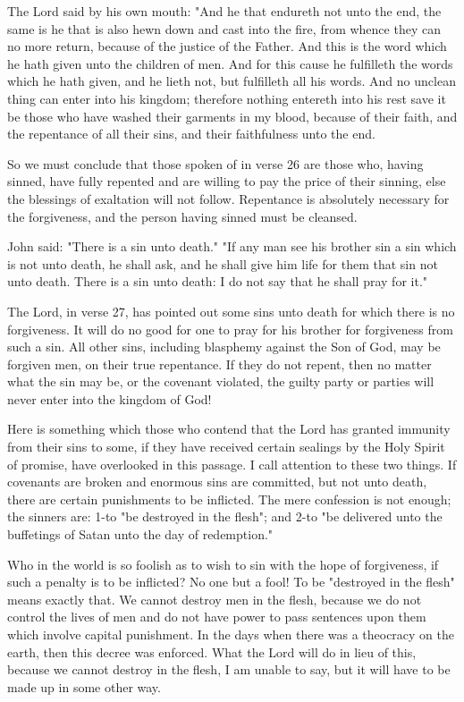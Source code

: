 \begin{compactdesc}
\begin{compactdesc}
					The Lord said by his own mouth: "And he that endureth not unto the end, the same is he that is also hewn down and cast into the fire, from whence they can no more return, because of the justice of the Father. And this is the word which he hath given unto the children of men. And for this cause he fulfilleth the words which he hath given, and he lieth not, but fulfilleth all his words. And no unclean thing can enter into his kingdom; therefore nothing entereth into his rest save it be those who have washed their garments in my blood, because of their faith, and the repentance of all their sins, and their faithfulness unto the end.

					So we must conclude that those spoken of in verse 26 are those who, having sinned, have fully repented and are willing to pay the price of their sinning, else the blessings of exaltation will not follow. Repentance is absolutely necessary for the forgiveness, and the person having sinned must be cleansed.

					John said: "There is a sin unto death." "If any man see his brother sin a sin which is not unto death, he shall ask, and he shall give him life for them that sin not unto death. There is a sin unto death: I do not say that he shall pray for it."

					The Lord, in verse 27, has pointed out some sins unto death for which there is no forgiveness. It will do no good for one to pray for his brother for forgiveness from such a sin. All other sins, including blasphemy against the Son of God, may be forgiven men, on their true repentance. If they do not repent, then no matter what the sin may be, or the covenant violated, the guilty party or parties will never enter into the kingdom of God!

					Here is something which those who contend that the Lord has granted immunity from their sins to some, if they have received certain sealings by the Holy Spirit of promise, have overlooked in this passage. I call attention to these two things. If covenants are broken and enormous sins are committed, but not unto death, there are certain punishments to be inflicted. The mere confession is not enough; the sinners are: 1-to "be destroyed in the flesh"; and 2-to "be delivered unto the buffetings of Satan unto the day of redemption."

					Who in the world is so foolish as to wish to sin with the hope of forgiveness, if such a penalty is to be inflicted? No one but a fool! To be "destroyed in the flesh" means exactly that. We cannot destroy men in the flesh, because we do not control the lives of men and do not have power to pass sentences upon them which involve capital punishment. In the days when there was a theocracy on the earth, then this decree was enforced. What the Lord will do in lieu of this, because we cannot destroy in the flesh, I am unable to say, but it will have to be made up in some other way.


\end{compactdesc}
\end{compactdesc}

